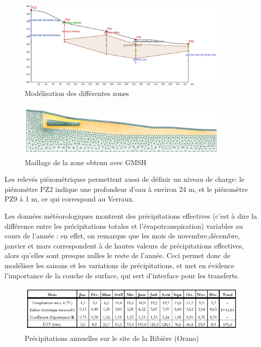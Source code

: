 \documentclass{article}
\begin{document}
\begin{figure}[H]
    \centering
    \includegraphics[width = 0.9\textwidth]{III_B_3_2.jpg} 
    \caption{Modélisation des différentes zones}
    \label{fig:zones_ribieres_geogebra}
\end{figure}


\begin{figure}[H]
    \centering
        \includegraphics[width=0.9\textwidth]{III_B_3_3.png} 
        \caption{Maillage de la zone obtenu avec GMSH}
        \label{maillage_ribiere}
\end{figure}

Les relevés piézométriques permettent aussi de définir un niveau de charge: le piézomètre PZ2 indique une profondeur d’eau à environ 24 m, et le piézomètre PZ9 à 1 m, ce qui correspond au Verraux.

Les données météorologiques montrent des précipitations effectives (c’est à dire la différence entre les précipitations totales et l’évapotranspiration) variables au cours de l’année : en effet, on remarque que les mois de novembre,décembre, janvier et mars correspondent à de hautes valeurs de précipitations effectives, alors qu’elles sont presque nulles le reste de l’année. Ceci permet donc de modéliser les saisons et les variations de précipitations, et met en évidence l’importance de la couche de surface, qui sert d’interface pour les transferts.


\begin{figure}[H]
    \centering
    \includegraphics[width=0.8\linewidth]{III_B_3_4.png}
    \caption{Précipitations annuelles sur le site de la Ribière (Orano)}
    \label{fig:precipitations_ribiere}
\end{figure}
\end{document}
